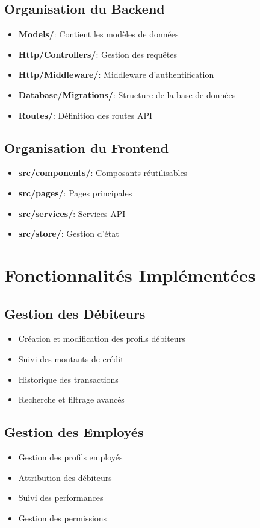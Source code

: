 \documentclass[12pt,a4paper]{report}
\begin{document}
\subsection{Organisation du Backend}
\begin{itemize}
    \item \textbf{Models/}: Contient les modèles de données
    \item \textbf{Http/Controllers/}: Gestion des requêtes
    \item \textbf{Http/Middleware/}: Middleware d'authentification
    \item \textbf{Database/Migrations/}: Structure de la base de données
    \item \textbf{Routes/}: Définition des routes API
\end{itemize}

\subsection{Organisation du Frontend}
\begin{itemize}
    \item \textbf{src/components/}: Composants réutilisables
    \item \textbf{src/pages/}: Pages principales
    \item \textbf{src/services/}: Services API
    \item \textbf{src/store/}: Gestion d'état
\end{itemize}

\section{Fonctionnalités Implémentées}
\subsection{Gestion des Débiteurs}
\begin{itemize}
    \item Création et modification des profils débiteurs
    \item Suivi des montants de crédit
    \item Historique des transactions
    \item Recherche et filtrage avancés
\end{itemize}

\subsection{Gestion des Employés}
\begin{itemize}
    \item Gestion des profils employés
    \item Attribution des débiteurs
    \item Suivi des performances
    \item Gestion des permissions
\end{itemize}
\end{document}
